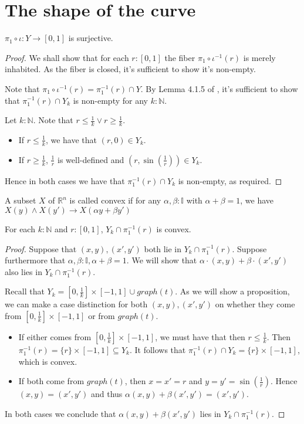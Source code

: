 \documentclass{../util/zariski}
\begin{document}
\section{The shape of the curve}
\begin{lemma}
  $\pi_1\circ \iota : Y \to [0,1]$ is surjective.  
\end{lemma}
\begin{proof}
  We shall show that for each $r:[0,1]$ the fiber $\pi_1\circ \iota^{-1}(r)$ is merely inhabited. 
  As the fiber is closed, it's sufficient to show it's non-empty. 

  Note that $\pi_1\circ \iota^{-1}(r)= \pi_1^{-1}(r) \cap Y$. 
  By Lemma 4.1.5 of \cite{synthetic-stone-duality}, 
  it's sufficient to show that $\pi_1^{-1}(r) \cap Y_k$ 
  is non-empty for any $k:\mathbb N$. 

  Let $k:\mathbb N$. 
  Note that $r\leq \frac1k \vee r \geq \frac 1k$. 
  \begin{itemize}
    \item If $r\leq \frac1k$, we have that $(r,0) \in Y_k$. 
    \item If $r\geq \frac1k$, $\frac1r$ is well-defined and 
      $(r,\sin(\frac1r)) \in Y_k$. 
  \end{itemize}
  Hence in both cases we have that $\pi_1^{-1}(r) \cap Y_k$ is non-empty, as required. 
\end{proof}

\begin{definition}
  A subset $X$ of $\mathbb R^n$ is called convex if 
  for any $\alpha,\beta:\mathbb I$ with $\alpha + \beta = 1$, we have 
  $X(y) \wedge X(y') \to X(\alpha y + \beta y')$
\end{definition}
\begin{lemma}
  For each $k:\mathbb N$ and $r:[0,1]$, $Y_k\cap \pi_1^{-1}(r)$ is convex. 
\end{lemma}
\begin{proof}
  Suppose that $(x,y), (x',y')$ both lie in $Y_k\cap \pi_1^{-1}(r)$. 
  Suppose furthermore that $\alpha,\beta:\mathbb I, \alpha+ \beta = 1$. 
  We will show that $\alpha\cdot (x,y) + \beta\cdot (x',y') $ also lies in 
  $Y_k \cap \pi_1^{-1}(r)$. 

  Recall that 
  $Y_k = [0,\frac1k] \times [-1,1]  \cup graph(t)$. 
  As we will show a proposition, we can make a case distinction 
  for both $(x,y), (x',y')$ on whether they come from $[0,\frac 1k] \times [-1,1]$ or 
  from $graph(t)$.
  \begin{itemize}
    \item 
      If either comes from $[0,\frac1k] \times [-1,1]$, we must have that 
      then $r \leq \frac1k$. 
      Then $\pi_1^{-1}(r) = \{r\} \times [-1,1]\subseteq Y_k$. 
      It follows that $\pi_1^{-1}(r) \cap Y_k = \{r\} \times [-1, 1]$, which is convex. 
    \item 
      If both come from $graph(t)$, 
      then $x = x' = r$ and $y = y' = \sin(\frac1r)$. 
      Hence $(x,y) = (x',y')$ and thus $\alpha(x,y) + \beta(x',y') = (x',y')$. 
  \end{itemize}
  In both cases we conclude that $\alpha (x,y) + \beta(x',y')$ lies in 
  $Y_k\cap \pi_1^{-1}(r)$. 
\end{proof}
\end{document}

